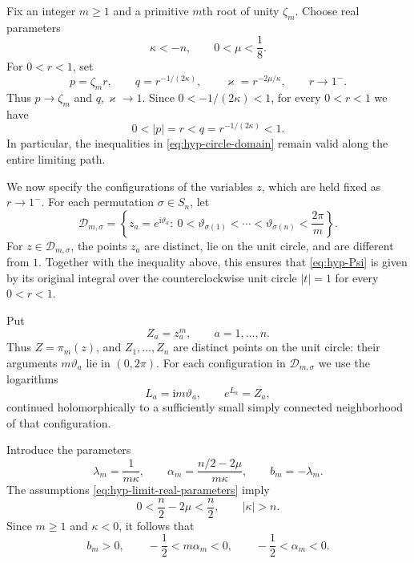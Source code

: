 \documentclass[12pt]{amsart}
\theoremstyle{definition}
\numberwithin{equation}{section}
\theoremstyle{definition}
\let\mc\mathcal
\let\ka\kappa
\let\si\sigma
\let\ge\geqslant
\def\beq{\begin{equation}}
\def\eeq{\end{equation}}
\begin{document}
Fix an integer $m\ge1$ and a primitive $m$th root of unity
$\zeta_m$.  Choose real parameters
\beq\label{eq:hyp-limit-real-parameters}
 \ka<-n,\qquad 0<\mu<\frac18.
\eeq
For $0<r<1$, set
\beq\label{eq:hyp-limit-scaling}
 p=\zeta_m r,\qquad
 q=r^{-1/(2\ka)},\qquad
 \varkappa=r^{-2\mu/\ka},
 \qquad r\longrightarrow1^-.
\eeq
Thus $p\to\zeta_m$ and $q,\varkappa\to1$.  Since
$0<-1/(2\ka)<1$, for every $0<r<1$ we have
\[
 0<|p|=r<q=r^{-1/(2\ka)}<1.
\]
In particular, the inequalities in \eqref{eq:hyp-circle-domain}
remain valid along the entire limiting path.

We now specify the configurations of the variables $z$, which
are held fixed as $r\to1^-$.  For each permutation $\si\in S_n$,
let
\beq\label{eq:hyp-limit-chamber-sigma}
 \mc D_{m,\si}=\left\{z_a=e^{\mathrm{i}\vartheta_a}:\
 0<\vartheta_{\si(1)}<\cdots<\vartheta_{\si(n)}
 <\frac{2\pi}{m}\right\}.
\eeq
For $z\in\mc D_{m,\si}$, the points $z_a$ are distinct, lie on
the unit circle, and are different from $1$.  Together with the
inequality above, this ensures that \eqref{eq:hyp-Psi} is given
by its original integral over the counterclockwise unit circle
$|t|=1$ for every $0<r<1$.

Put
\[
 Z_a=z_a^m,\qquad a=1,\ldots,n.
\]
Thus $Z=\pi_m(z)$, and $Z_1,\ldots,Z_n$ are distinct points on
the unit circle: their arguments $m\vartheta_a$ lie in $(0,2\pi)$.
For each configuration in $\mc D_{m,\si}$ we use the logarithms
\[
 L_a=\mathrm{i}m\vartheta_a,\qquad e^{L_a}=Z_a,
\]
continued holomorphically to a sufficiently small simply
connected neighborhood of that configuration.

Introduce the parameters
\beq\label{eq:hyp-limit-parameters}
 \lambda_m=\frac1{m\ka},\qquad
 \alpha_m=\frac{n/2-2\mu}{m\ka},\qquad
 b_m=-\lambda_m.
\eeq
The assumptions \eqref{eq:hyp-limit-real-parameters} imply
\[
 0<\frac n2-2\mu<\frac n2,\qquad |\ka|>n.
\]
Since $m\ge1$ and $\ka<0$, it follows that
\[
 b_m>0,\qquad
 -\frac12<m\alpha_m<0,\qquad
 -\frac12<\alpha_m<0.
\]
\end{document}
